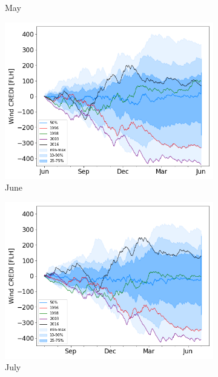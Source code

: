 \documentclass[a4paper,11pt]{extarticle}
\begin{document}
\begin{figure}[b]
\begin{subfigure}[t]{0.32\linewidth}
    \caption{May }
\end{subfigure}
\begin{subfigure}[t]{0.32\linewidth}
    \includegraphics[width=\linewidth]{Fig_CUMSUM_YearStart_June}
    \caption{June }
\end{subfigure}
\begin{subfigure}[t]{0.32\linewidth}
    \includegraphics[width=\linewidth]{Fig_CUMSUM_YearStart_July}
    \caption{July }
\end{subfigure}
\begin{subfigure}[t]{0.32\linewidth}

\end{subfigure}
\end{figure}
\end{document}
